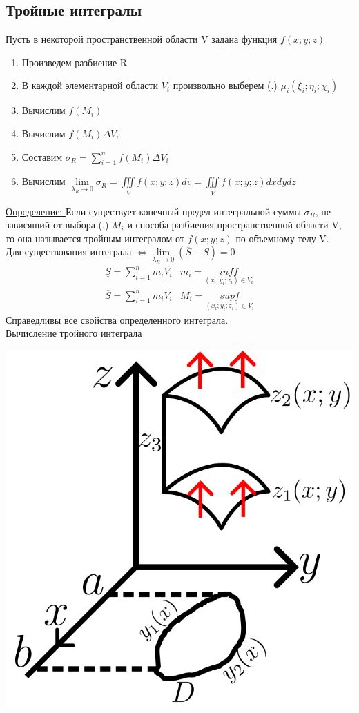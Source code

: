 \documentclass[12pt]{article}
\let\ORIincludegraphics\includegraphics
\renewcommand{\includegraphics}[2][]{\ORIincludegraphics[scale=0.65,#1]{#2}}
\let\oldiiint\iiint
\let\oldsum\sum
\let\oldlim\lim
\renewcommand{\iiint}{\oldiiint\limits}
\renewcommand{\sum}{\oldsum\limits}
\renewcommand{\lim}{\oldlim\limits}
\begin{document}
  \subsection{Тройные интегралы}
  Пусть в некоторой пространственной области V задана функция $f(x;y;z)$
  \begin{enumerate}
    \item Произведем разбиение R
    \item В каждой элементарной области $V_i$ произвольно выберем (.) $\mu_i (\xi_i;\eta_i;\chi_i)$
    \item Вычислим $f(M_i)$
    \item Вычислим $f(M_i)\Delta V_i$
    \item Составим $\sigma_R=\sum_{i=1}^{n}f(M_i)\Delta V_i$
    \item Вычислим $\lim_{\lambda_R \to 0}\sigma_R=\iiint_V f(x;y;z)dv = \iiint_V f(x;y;z) dxdydz$
  \end{enumerate}
  \underline{Определение: } Если существует конечный предел интегральной суммы $\sigma_R$, не зависящий от выбора (.) $M_i$
  и способа разбиения пространственной области V, то она называется тройным интегралом от $f(x;y;z)$ по объемному телу V.\\
  Для существования интеграла $\Leftrightarrow \lim_{\lambda_R \to 0} (\overline{S}-\underline{S})=0$
  \[\begin{matrix}
    \underline{S}=\sum_{i=1}^{n}m_i V_i & m_i = \underset{(x_i;y_i;z_i) \in V_i}{inf f}\\
    \overline{S}=\sum_{i=1}^{n}m_i V_i & M_i = \underset{(x_i;y_i;z_i) \in V_i}{sup f}
  \end{matrix}\]
  Справедливы все свойства определенного интеграла.\\
  \break
  \underline{Вычисление тройного интеграла}\\
  \begin{minipage}{0.45\textwidth}
    \includegraphics[scale=0.6]{8.23.1.png}
  \end{minipage}
\end{document}
